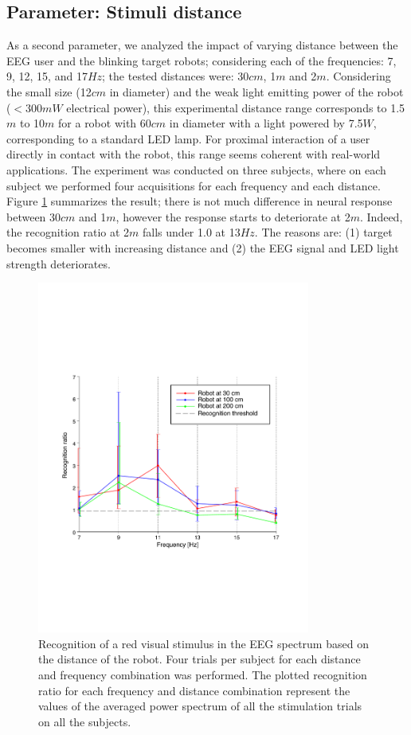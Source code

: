 \documentclass[smallextended]{svjour3}
\begin{document}
\subsection{Parameter: Stimuli distance}
As a second parameter, we analyzed the impact of varying distance between the EEG user and the blinking target robots; considering each of the frequencies: 7, 9, 12, 15, and 17$Hz$; the tested distances were: 30$cm$, 1$m$ and 2$m$. 
Considering the small size (12$cm$ in diameter) and the weak light emitting power of the robot ($< 300mW$ electrical power), this experimental distance range corresponds to 1.5$m$ to 10$m$ for a robot with 60$cm$ in diameter with a light powered by 7.5$W$, corresponding to a standard LED lamp. 
For proximal interaction of a user directly in contact with the robot, this range seems coherent with real-world applications.
The experiment was conducted on three subjects, where on each subject we performed four acquisitions for each frequency and each distance. Figure \ref{fig:graph-distances} summarizes the result; there is not much difference in neural response between 30$cm$ and 1$m$, however the response starts to deteriorate at 2$m$. Indeed, the recognition ratio at 2$m$ falls under 1.0 at 13$Hz$. The reasons are: (1) target becomes smaller with increasing distance and (2) the EEG signal and LED light strength deteriorates.

\begin{figure}
\center
\includegraphics[width=0.8\textwidth]{figures/graph-distances.pdf}
\caption{Recognition of a red visual stimulus in the EEG spectrum based on the distance of the robot. Four trials per subject for each distance and frequency combination was performed. The plotted recognition ratio for each frequency and distance combination represent the values of the averaged power spectrum of all the stimulation trials on all the subjects.}
\label{fig:graph-distances}
\end{figure}
\end{document}
